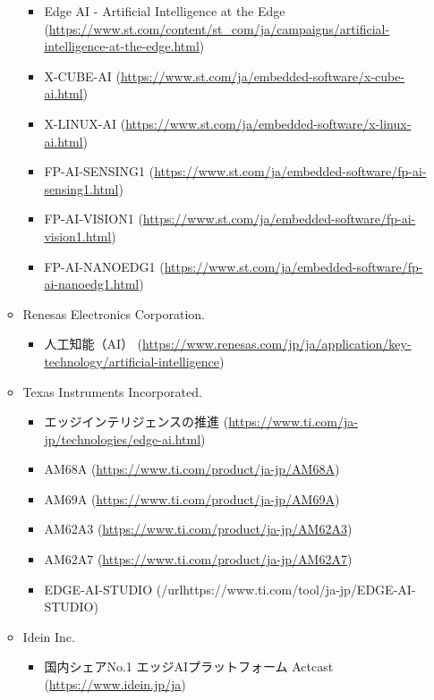 \begin{itemize}
\begin{itemize}
\begin{itemize}
			\item Edge AI - Artificial Intelligence at the Edge (\url{https://www.st.com/content/st_com/ja/campaigns/artificial-intelligence-at-the-edge.html})
			\item X-CUBE-AI (\url{https://www.st.com/ja/embedded-software/x-cube-ai.html})
			\item X-LINUX-AI (\url{https://www.st.com/ja/embedded-software/x-linux-ai.html})
			\item FP-AI-SENSING1 (\url{https://www.st.com/ja/embedded-software/fp-ai-sensing1.html})
			\item FP-AI-VISION1 (\url{https://www.st.com/ja/embedded-software/fp-ai-vision1.html})
			\item FP-AI-NANOEDG1 (\url{https://www.st.com/ja/embedded-software/fp-ai-nanoedg1.html})
		\end{itemize}
		\item Renesas Electronics Corporation.
		\begin{itemize}
			\item 人工知能（AI） (\url{https://www.renesas.com/jp/ja/application/key-technology/artificial-intelligence})
		\end{itemize}
		\item Texas Instruments Incorporated.
		\begin{itemize}
			\item エッジインテリジェンスの推進 (\url{https://www.ti.com/ja-jp/technologies/edge-ai.html})
			\item AM68A (\url{https://www.ti.com/product/ja-jp/AM68A})
			\item AM69A (\url{https://www.ti.com/product/ja-jp/AM69A})
			\item AM62A3 (\url{https://www.ti.com/product/ja-jp/AM62A3})
			\item AM62A7 (\url{https://www.ti.com/product/ja-jp/AM62A7})
			\item EDGE-AI-STUDIO (/url{https://www.ti.com/tool/ja-jp/EDGE-AI-STUDIO})
		\end{itemize}
		\item Idein Inc.
		\begin{itemize}
			\item 国内シェアNo.1 エッジAIプラットフォーム Actcast (\url{https://www.idein.jp/ja})
		\end{itemize}
	\end{itemize}
\end{itemize}

